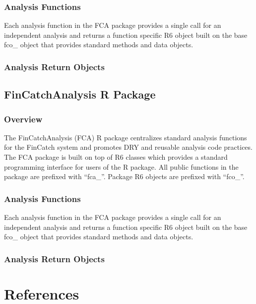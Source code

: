 \documentclass[
  letterpaper,
  DIV=11,
  numbers=noendperiod]{scrreprt}
\newlength{\cslhangindent}
\newlength{\cslentryspacingunit} %
\newenvironment{CSLReferences}[2] %
 {%
  \setlength{\parindent}{0pt}
  \ifodd #1
  \let\oldpar\par
  \def\par{\hangindent=\cslhangindent\oldpar}
  \fi
  \setlength{\parskip}{#2\cslentryspacingunit}
 }%
 {}
\begin{document}
\hypertarget{analysis-functions}{%
\section*{Analysis Functions}\label{analysis-functions}}

Each analysis function in the FCA package provides a single call for an
independent analysis and returns a function specific R6 object built on
the base fco\_ object that provides standard methods and data objects.

\hypertarget{analysis-return-objects}{%
\section*{Analysis Return Objects}\label{analysis-return-objects}}

\hypertarget{fincatchanalysis-r-package-1}{%
\chapter{FinCatchAnalysis R
Package}\label{fincatchanalysis-r-package-1}}

\hypertarget{overview-1}{%
\section*{Overview}\label{overview-1}}

The FinCatchAnalysis (FCA) R package centralizes standard analysis
functions for the FinCatch system and promotes DRY and reusable analysis
code practices. The FCA package is built on top of R6 classes which
provides a standard programming interface for users of the R package.
All public functions in the package are prefixed with ``fca\_''. Package
R6 objects are prefixed with ``fco\_''.

\hypertarget{analysis-functions-1}{%
\section{Analysis Functions}\label{analysis-functions-1}}

Each analysis function in the FCA package provides a single call for an
independent analysis and returns a function specific R6 object built on
the base fco\_ object that provides standard methods and data objects.

\hypertarget{analysis-return-objects-1}{%
\section{Analysis Return Objects}\label{analysis-return-objects-1}}

\part{References}

\hypertarget{refs}{}
\begin{CSLReferences}{0}{0}
\end{CSLReferences}
\end{document}
